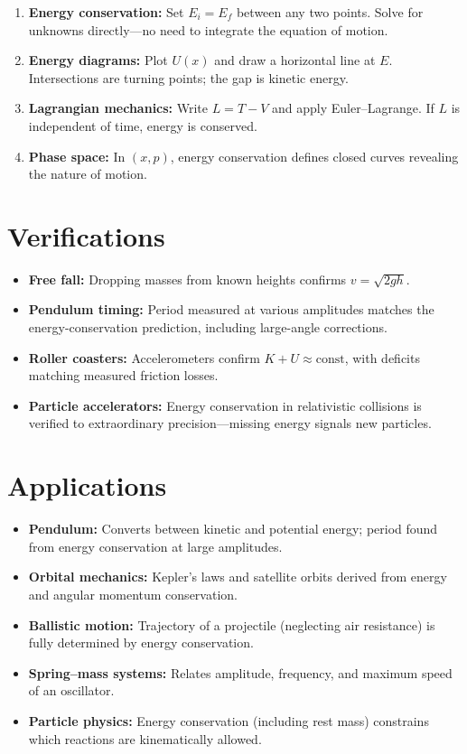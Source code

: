 \documentclass[11pt,openright]{book}
\begin{document}
\begin{enumerate}
\item \textbf{Energy conservation:} Set $E_i = E_f$ between any two points. Solve for unknowns directly---no need to integrate the equation of motion.
\item \textbf{Energy diagrams:} Plot $U(x)$ and draw a horizontal line at $E$. Intersections are turning points; the gap is kinetic energy.
\item \textbf{Lagrangian mechanics:} Write $L = T - V$ and apply Euler--Lagrange. If $L$ is independent of time, energy is conserved.
\item \textbf{Phase space:} In $(x, p)$, energy conservation defines closed curves revealing the nature of motion.
\end{enumerate}
\section*{Verifications}

\begin{itemize}
\item \textbf{Free fall:} Dropping masses from known heights confirms $v = \sqrt{2gh}$.
\item \textbf{Pendulum timing:} Period measured at various amplitudes matches the energy-conservation prediction, including large-angle corrections.
\item \textbf{Roller coasters:} Accelerometers confirm $K + U \approx \text{const}$, with deficits matching measured friction losses.
\item \textbf{Particle accelerators:} Energy conservation in relativistic collisions is verified to extraordinary precision---missing energy signals new particles.
\end{itemize}
\section*{Applications}

\begin{itemize}
\item \textbf{Pendulum:} Converts between kinetic and potential energy; period found from energy conservation at large amplitudes.
\item \textbf{Orbital mechanics:} Kepler's laws and satellite orbits derived from energy and angular momentum conservation.
\item \textbf{Ballistic motion:} Trajectory of a projectile (neglecting air resistance) is fully determined by energy conservation.
\item \textbf{Spring--mass systems:} Relates amplitude, frequency, and maximum speed of an oscillator.
\item \textbf{Particle physics:} Energy conservation (including rest mass) constrains which reactions are kinematically allowed.
\end{itemize}
\end{document}
